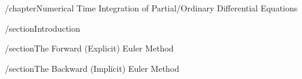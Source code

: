 /chapter{Numerical Time Integration of Partial/Ordinary Differential Equations}

/section{Introduction}

/section{The Forward (Explicit) Euler Method}

/section{The Backward (Implicit) Euler Method}
